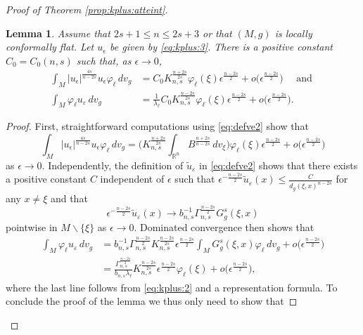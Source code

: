 \documentclass[10pt]{amsart}
\numberwithin{equation}{section}
\newcommand{\R}{\mathbb{R}}
\def\ep{{\varepsilon}}
\newcommand{\ve}{\varepsilon}
\newcommand{\vp}{\varphi}
\def \ep{\epsilon}
\theoremstyle{plain}
\newtheorem{lemme}{Lemma}[section]%
\theoremstyle{remark}
\begin{document}
\begin{proof}[Proof of Theorem \ref{prop:kplus:atteint}]
\begin{lemme}
Assume that $2s+1 \le n \le 2s+3$ or that $(M,g)$ is locally conformally flat. Let $u_\ep$ be given by \eqref{eq:kplus:3}. There is a positive constant $C_0 = C_0(n,s)$ such that, as $\ep \to 0$,
\begin{equation} \label{eq:kplus:5bis}
\begin{aligned}
\int_{M} |u_{\ep}|^{\frac{4s}{n-2s}} u_\ep \varphi_{\ell}\, dv_g & = C_0 K_{n,s}^{\frac{n+2s}{2s}}  \varphi_{\ell}(\xi) \ep^{\frac{n-2s}{2}}  + o \big(\ep^{\frac{n-2s}{2}} \big) \quad \text{ and } \\
\int_{M} \vp_\ell u_\ve \, dv_g  &= \frac{1}{\lambda_\ell}C_0 K_{n,s}^{\frac{n-2s}{2s}} \varphi_{\ell}(\xi) \ep^{\frac{n-2s}{2}}  + o \big(\ep^{\frac{n-2s}{2}} \big).
\end{aligned}
\end{equation}  
\end{lemme}
\begin{proof}
First, straightforward computations using \eqref{eq:defve2} show that 
\begin{equation*}
\int_{M} |u_{\ep}|^{\frac{4s}{n-2s}} u_\ep \varphi_{\ell}\, dv_g  = \Big( K_{n,s}^{\frac{n+2s}{2s}} \int_{\R^n} B^{\frac{n+2s}{n-2s}} \, dv_\xi \Big) \varphi_{\ell}(\xi) \ep^{\frac{n-2s}{2}}  + o \big(\ep^{\frac{n-2s}{2}} \big)
\end{equation*}
as $\ep \to 0$. Independently, the definition of $\tilde{u}_{\ve}$ in \eqref{eq:defve2} shows that there exists a positive constant $C$ independent of $\ep$ such that $\ep^{- \frac{n-2s}{2}} \tilde{u}_{\ve}(x) \le \frac{C}{d_g(\xi, x)^{n-2s}}$ for any $x \neq \xi$ and that 
$$ \ep^{- \frac{n-2s}{2}} \tilde{u}_{\ve}(x) \to b_{n,s}^{-1}\Gamma_{n,s}^{\frac{n-2s}{2}}G_g^s(\xi, x) $$
pointwise in $M \backslash \{\xi\}$ as $\ep \to 0$. Dominated convergence then shows that 
\begin{equation*}
\begin{aligned}
\int_{M} \vp_\ell u_\ve \, dv_g & = b_{n,s}^{-1}\Gamma_{n,s}^{\frac{n-2s}{2}} K_{n,s}^{\frac{n-2s}{2 s}} \ep^{\frac{n-2s}{2}} \int_M G_g^s(\xi, x)   \vp_\ell \, dv_g   + o \big(\ep^{\frac{n-2s}{2}} \big) \\
& = \frac{\Gamma_{n,s}^{\frac{n-2s}{2}}}{b_{n,s} \lambda_\ell}K_{n,s}^{\frac{n-2s}{2s}} \ep^{\frac{n-2s}{2}}  \varphi_\ell(\xi) + o \big(\ep^{\frac{n-2s}{2}} \big),
\end{aligned} 
\end{equation*}
where the last line follows from \eqref{eq:kplus:2} and a representation formula. To conclude the proof of the lemma we thus only need to show that 

\end{proof}
\end{proof}
\end{document}
